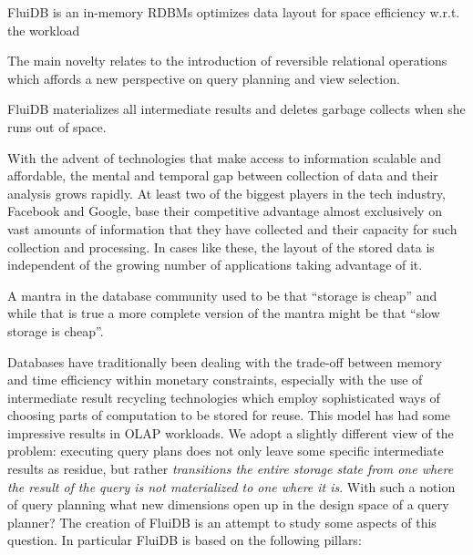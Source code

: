 
\begin{summary}
\item FluiDB is an in-memory RDBMs optimizes data layout for space
  efficiency w.r.t. the workload
\item The main novelty relates to the introduction of reversible
  relational operations which affords a new perspective on query
  planning and view selection.
\item FluiDB materializes all intermediate results and deletes garbage
  collects when she runs out of space.
\end{summary}

With the advent of technologies that make access to information
scalable and affordable, the mental and temporal gap between
collection of data and their analysis grows rapidly. At least two of
the biggest players in the tech industry, Facebook and Google,
base their competitive advantage almost exclusively on vast amounts of
information that they have collected and their capacity for such
collection and processing. In cases like these, the layout of the
stored data is independent of the growing number of applications
taking advantage of it.

A mantra in the database community used to be that ``storage is cheap''
and while that is true a more complete version of the mantra might be
that ``slow storage is cheap''.

Databases have traditionally been dealing with the trade-off between
memory and time efficiency within monetary constraints, especially with
the use of intermediate result recycling technologies which employ
sophisticated ways of choosing parts of computation to be stored for
reuse. This model has had some impressive results in OLAP
workloads. We adopt a slightly different view of the problem:
executing query plans does not only leave some specific intermediate
results as residue, but rather \emph{transitions the entire storage
  state from one where the result of the query is not materialized to
  one where it is}. With such a notion of query planning what new
dimensions open up in the design space of a query planner? The creation
of FluiDB is an attempt to study some aspects of this question. In
particular FluiDB is based on the following pillars:

